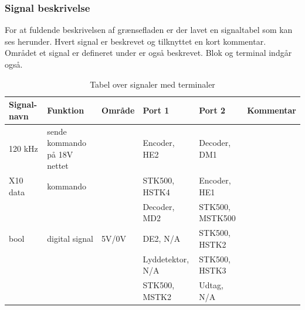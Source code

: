 \begin{table}[htbp]
\subsubsection{Signal beskrivelse}
For at fuldende beskrivelsen af grænsefladen er der lavet en signaltabel som kan ses herunder. Hvert signal er beskrevet og tilknyttet en kort kommentar. Området et signal er defineret under er også beskrevet. Blok og terminal indgår også. 
\caption{Tabel over signaler med terminaler}
\begin{small}
\begin{tabular}{|p{2cm}|p{2cm}|p{2cm}|p{2cm}|p{2cm}|p{}|}
\hline
\textbf{Signal-navn} & \textbf{Funktion} & \textbf{Område} & \textbf{Port 1} & \textbf{Port 2} & \textbf{Kommentar} \\ \hline

120 kHz & sende kommando på 18V nettet & & Encoder, HE2 & Decoder, DM1 & \\ \hline

X10 data & kommando & & STK500, HSTK4 & Encoder, HE1 & \\ \cline{4-5}
&&& Decoder, MD2 & STK500, MSTK500 &\\ \hline

bool & digital signal & 5V/0V & DE2, N/A & STK500, HSTK2 & \\ \cline{4-5}
&&& Lyddetektor, N/A & STK500, HSTK3 & \\ \cline{4-5}
&&& STK500, MSTK2 & Udtag, N/A & \\ \hline
\end{tabular}
\end{small}
\label{table:Signaltabel}
\end{table}


